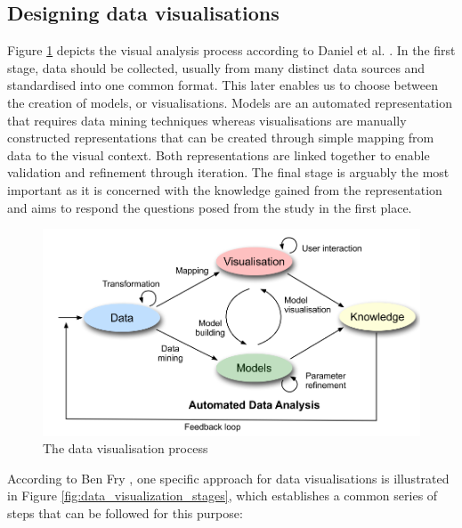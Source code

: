 \subsection{Designing data visualisations}
Figure \ref{fig:data_visualization_process} depicts the visual analysis process according to Daniel et al. \cite{KeimDaniel2010}. In the first stage,  data should be collected, usually from many distinct data sources and standardised into one common format. This later enables us to choose between the creation of models, or visualisations. Models are an automated representation that requires data mining techniques whereas visualisations are manually constructed  representations that can be created through simple mapping from data to the visual context. Both representations are linked together to enable validation and refinement through iteration. The final stage is arguably the most important as it is concerned with the knowledge gained from the representation and aims to respond the questions posed from the study in the first place.
\begin{figure}[!htb]
\begin{adjustbox}{width=1\textwidth,center=\textwidth}
  \centering

\includegraphics[scale=1]{images/data_visualization_process.png}
\end{adjustbox}
  \caption[The data visualisation process]{The data visualisation process \cite{KeimDaniel2010} }
  \label{fig:data_visualization_process}
\end{figure}

According to Ben Fry \cite{Cleveland1993}, one specific approach for data visualisations is illustrated in Figure \ref{fig:data_visualization_stages}, which establishes a common series of steps that can be followed for this purpose:

